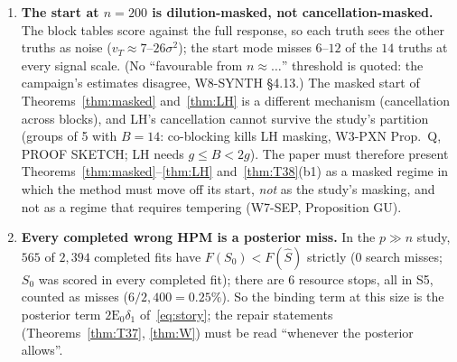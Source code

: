\documentclass[11pt]{article}
\theoremstyle{definition}
\theoremstyle{remark}
\newcommand{\E}{\mathrm{E}}
\newcommand{\Sz}{S_0}
\newcommand{\Sh}{\widehat S}
\begin{document}
\begin{enumerate}
\item[1.] \textbf{The start at $n=200$ is dilution-masked, not cancellation-masked.}
The block tables score against the full response, so each truth sees the other truths as noise ($v_T\approx7$--$26\sigma^2$); the start mode misses $6$--$12$ of the $14$ truths at every signal scale. (No ``favourable from $n\approx\dots$'' threshold is quoted: the campaign's estimates disagree, W8-SYNTH \S4.13.) The masked start of Theorems~\ref{thm:masked} and~\ref{thm:LH} is a different mechanism (cancellation across blocks), and LH's cancellation cannot survive the study's partition (groups of 5 with $B=14$: co-blocking kills LH masking, W3-PXN Prop.~Q, PROOF SKETCH; LH needs $g\le B<2g$). The paper must therefore present Theorems~\ref{thm:masked}--\ref{thm:LH} and~\ref{thm:T38}(b1) as a masked regime in which the method must move off its start, \emph{not} as the study's masking, and not as a regime that requires tempering (W7-SEP, Proposition GU).

\item[2.] \textbf{Every completed wrong HPM is a posterior miss.}
In the $p\gg n$ study, $565$ of $2{,}394$ completed fits have $F(\Sz)<F(\Sh)$ strictly ($0$ search misses; $\Sz$ was scored in every completed fit); there are $6$ resource stops, all in S5, counted as misses ($6/2{,}400=0.25\%$). So the binding term at this size is the posterior term $2\E_0\delta_1$ of~\eqref{eq:story}; the repair statements (Theorems~\ref{thm:T37}, \ref{thm:W}) must be read ``whenever the posterior allows''.


\end{enumerate}
\end{document}
